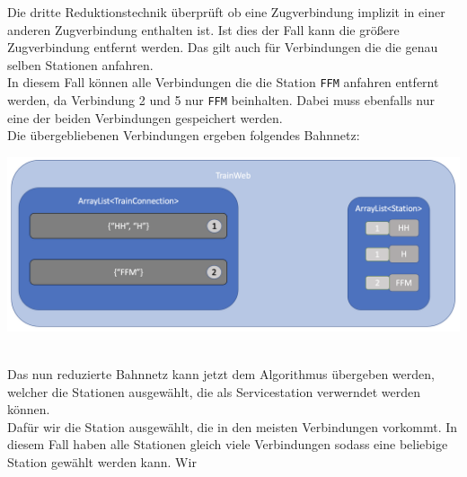 Die dritte Reduktionstechnik überprüft ob eine Zugverbindung implizit in einer anderen Zugverbindung enthalten ist. Ist dies der Fall kann die größere Zugverbindung entfernt werden. Das gilt auch für Verbindungen die die genau selben Stationen anfahren.\\
In diesem Fall können alle Verbindungen die die Station \texttt{FFM} anfahren entfernt werden, da Verbindung 2 und 5 nur \texttt{FFM} beinhalten. Dabei muss ebenfalls nur eine der beiden Verbindungen gespeichert werden.\\
Die übergebliebenen Verbindungen ergeben folgendes Bahnnetz:\\

\begin{center}
    \includegraphics[width=\linewidth]{images/Programmdurchlauf/Datenstruktur03.png}
    \label{test:subsecpar:datenstruktur2}
\end{center}
\\
Das nun reduzierte Bahnnetz kann jetzt dem Algorithmus übergeben werden, welcher die Stationen ausgewählt, die als Servicestation verwerndet werden können.\\
Dafür wir die Station ausgewählt, die in den meisten Verbindungen vorkommt. In diesem Fall haben alle Stationen gleich viele Verbindungen sodass eine beliebige Station gewählt werden kann. Wir\\